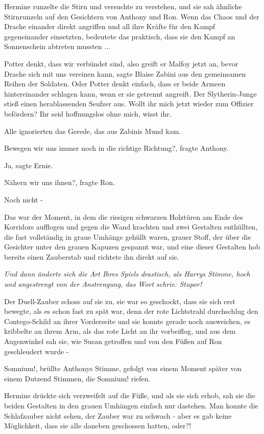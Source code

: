 Hermine runzelte die Stirn und versuchte zu verstehen, und sie sah ähnliche
Stirnrunzeln auf den Gesichtern von Anthony und Ron. Wenn das Chaos und der
Drache einander direkt angriffen und all ihre Kräfte für den Kampf gegeneinander
einsetzten, bedeutete das praktisch, dass sie den Kampf an Sonnenschein abtreten
mussten ...

\glqq{}Potter denkt, dass wir verbündet sind, also greift er Malfoy jetzt an,
bevor Drache sich mit uns vereinen kann\grqq{}, sagte Blaise Zabini aus den
gemeinsamen Reihen der Soldaten. \glqq{}Oder Potter denkt einfach, dass er beide
Armeen hintereinander schlagen kann, wenn er sie getrennt angreift.\grqq{} Der
Slytherin-Junge stieß einen herablassenden Seufzer aus. \glqq{}Wollt ihr mich
jetzt wieder zum Offizier befördern? Ihr seid hoffnungslos ohne mich, wisst
ihr.\grqq{}

Alle ignorierten das Gerede, das aus Zabinis Mund kam.

\glqq{}Bewegen wir uns immer noch in die richtige Richtung?\grqq{}, fragte
Anthony.

\glqq{}Ja\grqq{}, sagte Ernie.

\glqq{}Nähern wir uns ihnen?\grqq{}, fragte Ron.

\glqq{}Noch nicht -\grqq{}

Das war der Moment, in dem die riesigen schwarzen Holztüren am Ende des
Korridors aufflogen und gegen die Wand krachten und zwei Gestalten enthüllten,
die fast vollständig in graue Umhänge gehüllt waren, grauer Stoff, der über die
Gesichter unter den grauen Kapuzen gespannt war, und eine dieser Gestalten hob
bereits einen Zauberstab und richtete ihn direkt auf sie.

\emph{Und dann änderte sich die Art Ihres Spiels drastisch, als Harrys Stimme,
hoch und angestrengt von der Anstrengung, das Wort schrie: \glqq{}Stupor!\grqq{}
}

Der Duell-Zauber schoss auf sie zu, sie war so geschockt, dass sie sich erst
bewegte, als es schon fast zu spät war, denn der rote Lichtstrahl durchschlug
den Contego-Schild an ihrer Vorderseite und sie konnte gerade noch ausweichen,
es kribbelte an ihrem Arm, als das rote Licht an ihr vorbeiflog, und aus dem
Augenwinkel sah sie, wie Susan getroffen und von den Füßen auf Ron geschleudert
wurde -

\glqq{}Somnium!\grqq{}, brüllte Anthonys Stimme, gefolgt von einem Moment später
von einem Dutzend Stimmen, die \glqq{}Somnium!\grqq{} riefen.

Hermine drückte sich verzweifelt auf die Füße, und als sie sich erhob, sah sie
die beiden Gestalten in den grauen Umhängen einfach nur dastehen. Man konnte die
Schlafzauber nicht sehen, der Zauber war zu schwach - aber es gab keine
Möglichkeit, dass sie alle daneben geschossen hatten, oder?!

